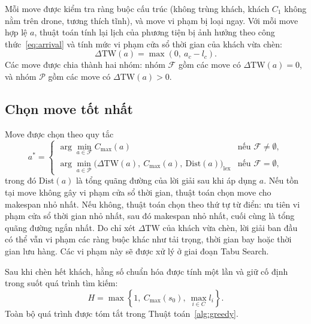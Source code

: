 \documentclass[../DoAn.tex]{subfiles}
\begin{document}
Mỗi move được kiểm tra ràng buộc cấu trúc (không trùng khách, khách $C_1$ không nằm trên drone, tương thích tĩnh), và move vi phạm bị loại ngay. Với mỗi move hợp lệ $a$, thuật toán tính lại lịch của phương tiện bị ảnh hưởng theo công thức~\eqref{eq:arrival} và tính mức vi phạm cửa sổ thời gian của khách vừa chèn:
\begin{equation}
\Delta\mathrm{TW}(a) = \max\!\left(0,\ a_c - l_c\right).
\end{equation}
Các move được chia thành hai nhóm: nhóm $\mathcal{F}$ gồm các move có $\Delta\mathrm{TW}(a) = 0$, và nhóm $\mathcal{P}$ gồm các move có $\Delta\mathrm{TW}(a) > 0$.

\subsection{Chọn move tốt nhất}

Move được chọn theo quy tắc
\begin{equation}
a^* = \begin{cases}
\displaystyle\arg\min_{a \in \mathcal{F}} C_{\max}(a) & \text{nếu } \mathcal{F} \neq \emptyset, \\[6pt]
\displaystyle\arg\min_{a \in \mathcal{P}} \bigl(\Delta\mathrm{TW}(a),\ C_{\max}(a),\ \mathrm{Dist}(a)\bigr)_{\text{lex}} & \text{nếu } \mathcal{F} = \emptyset,
\end{cases}
\end{equation}
trong đó $\mathrm{Dist}(a)$ là tổng quãng đường của lời giải sau khi áp dụng $a$. Nếu tồn tại move không gây vi phạm cửa sổ thời gian, thuật toán chọn move cho makespan nhỏ nhất. Nếu không, thuật toán chọn theo thứ tự từ điển: ưu tiên vi phạm cửa sổ thời gian nhỏ nhất, sau đó makespan nhỏ nhất, cuối cùng là tổng quãng đường ngắn nhất. Do chỉ xét $\Delta\mathrm{TW}$ của khách vừa chèn, lời giải ban đầu có thể vẫn vi phạm các ràng buộc khác như tải trọng, thời gian bay hoặc thời gian lưu hàng. Các vi phạm này sẽ được xử lý ở giai đoạn Tabu Search.

Sau khi chèn hết khách, hằng số chuẩn hóa được tính một lần và giữ cố định trong suốt quá trình tìm kiếm:
\begin{equation}
H = \max\!\left\{1,\ C_{\max}(s_0),\ \max_{i \in C} l_i\right\}.
\label{eq:H}
\end{equation}
Toàn bộ quá trình được tóm tắt trong Thuật toán~\ref{alg:greedy}.
\end{document}
